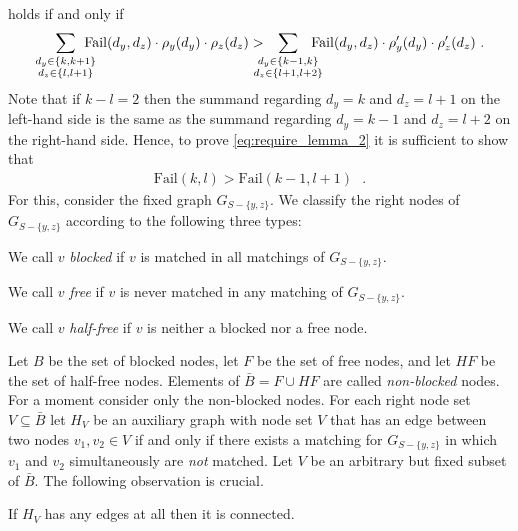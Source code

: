 \let\accentvec\vec \documentclass{llncs}
\newcommand{\degr}{\ensuremath{d}}
\newcommand{\blank}{\text{ }}
\newcommand{\graph}{\ensuremath{G}}
\newcommand{\low}{\ensuremath{l}}
\newcommand{\high}{\ensuremath{k}}
\newcommand{\Fail}{\mathrm{Fail}}
\newcommand{\mgap}{\hspace{-1em}}
\begin{document}
holds if and only if
 \begin{align}
  \label{eq:require_lemma_2}
   \sum_{\substack{\degr_y\in\{\high,\high+1\}\\\degr_z\in\{\low,\low+1\}}}\mgap   \Fail(\degr_y,\degr_z) \cdot \rho_y(\degr_y)\cdot\rho_z(\degr_z) 
 >\mgap \sum_{\substack{\degr_y\in\{\high-1,\high\}\\\degr_z\in\{\low+1,\low+2\}}}\mgap \Fail(\degr_y,\degr_z) \cdot \rho'_y(\degr_y)\cdot\rho'_z(\degr_z) \blank. 
 \end{align}
Note that if $\high-\low=2$ then the summand regarding $\degr_y= \high$ and $\degr_z=\low+1$ on the left-hand side
is the same as the summand regarding $\degr_y= \high-1$ and $\degr_z=\low+2$ on the right-hand side.
Hence, to prove \eqref{eq:require_lemma_2} it is sufficient to show that
\begin{align}
\label{eq:failure_lemma_2_simple}
  \Fail(\high,\low)>\Fail(\high-1,\low+1)\blank.
\end{align}
For this, consider the fixed graph $\graph_{S-\{y,z\}}$. We classify the right nodes of $\graph_{S-\{y,z\}}$ according to the following three types:
\begin{compactitem}
 \item We call $v$ \emph{blocked}   if $v$ is matched in all matchings of $\graph_{S-\{y,z\}}$.
 \item We call $v$ \emph{free}      if $v$ is never matched in any matching of $\graph_{S-\{y,z\}}$.
 \item We call $v$ \emph{half-free} if $v$ is neither a blocked nor a free node.
\end{compactitem}
Let $B$ be the set of blocked nodes, let $F$ be the set of free nodes, and let $\mathit{HF}$ be the set of half-free nodes.
Elements of $\bar{B}=F \cup \mathit{HF}$ are called \emph{non-blocked} nodes.
For a moment consider only the non-blocked nodes. For each right node set $V\subseteq \bar{B}$
let $H_V$ be an auxiliary graph with node set $V$ that
has an edge between two nodes $v_1,v_2 \in V$ if and only if there exists a matching
for $\graph_{S-\{y,z\}}$ in which $v_1$ and $v_2$ simultaneously are \emph{not} matched.
Let $V$ be an arbitrary but fixed subset of $\bar{B}$. The following observation is crucial.
\begin{myClaim}
\label{claim:H_connected}
If $H_V$ has any edges at all then it is connected.
\end{myClaim}
\end{document}
